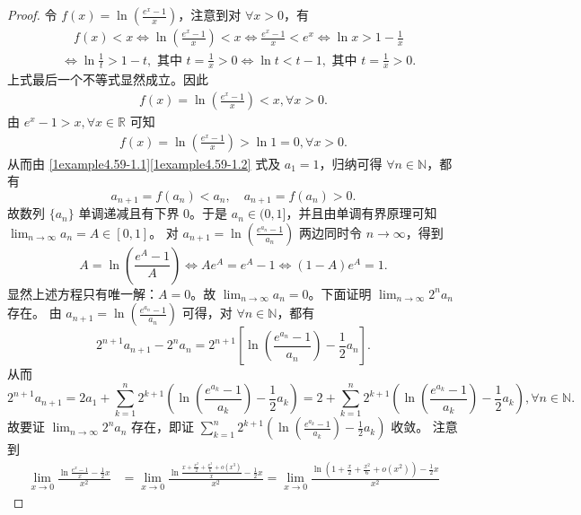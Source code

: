 \documentclass[../../main.tex]{subfiles}%
\begin{document}
\begin{proof}

令 \(f(x)=\ln\left(\frac{e^x - 1}{x}\right)\)，注意到对 \(\forall x > 0\)，有
\begin{align*}
& \quad f(x) < x \Leftrightarrow \ln\left(\frac{e^x - 1}{x}\right) < x \Leftrightarrow \frac{e^x - 1}{x} < e^x \Leftrightarrow \ln x > 1 - \frac{1}{x}\\
&\Leftrightarrow \ln\frac{1}{t} > 1 - t,\text{ 其中 }t = \frac{1}{x} > 0 \Leftrightarrow \ln t < t - 1,\text{ 其中 }t = \frac{1}{x} > 0.
\end{align*}
上式最后一个不等式显然成立。因此
\begin{align}
f(x)=\ln\left(\frac{e^x - 1}{x}\right) < x,\forall x > 0. \label{1example4.59-1.1}  
\end{align}
由 \(e^x - 1 > x,\forall x \in \mathbb{R}\) 可知
\begin{align}
f(x)=\ln\left(\frac{e^x - 1}{x}\right) > \ln 1 = 0,\forall x > 0. \label{1example4.59-1.2}
\end{align}
从而由 \eqref{1example4.59-1.1}\eqref{1example4.59-1.2} 式及 \(a_1 = 1\)，归纳可得 \(\forall n \in \mathbb{N}\)，都有
\[
a_{n + 1} = f(a_n) < a_n,\quad a_{n + 1} = f(a_n) > 0.
\]
故数列 \(\{ a_n \}\) 单调递减且有下界 \(0\)。于是 \(a_n \in (0, 1]\)，并且由单调有界原理可知 \(\lim_{n \to \infty} a_n = A \in [0, 1]\)。
对 \(a_{n + 1} = \ln\left(\frac{e^{a_n} - 1}{a_n}\right)\) 两边同时令 \(n \to \infty\)，得到
\[
A = \ln\left(\frac{e^A - 1}{A}\right) \Leftrightarrow Ae^A = e^A - 1 \Leftrightarrow (1 - A)e^A = 1.
\]
显然上述方程只有唯一解：\(A = 0\)。故 \(\lim_{n \to \infty} a_n = 0\)。下面证明 \(\lim_{n \to \infty} 2^n a_n\) 存在。
由 \(a_{n + 1} = \ln\left(\frac{e^{a_n} - 1}{a_n}\right)\) 可得，对 \(\forall n \in \mathbb{N}\)，都有
\[
2^{n + 1} a_{n + 1} - 2^n a_n = 2^{n + 1}\left[\ln\left(\frac{e^{a_n} - 1}{a_n}\right) - \frac{1}{2} a_n\right].
\]
从而
\[
2^{n + 1} a_{n + 1} = 2a_1 + \sum_{k = 1}^n 2^{k + 1}\left(\ln\left(\frac{e^{a_k} - 1}{a_k}\right) - \frac{1}{2} a_k\right) = 2 + \sum_{k = 1}^n 2^{k + 1}\left(\ln\left(\frac{e^{a_k} - 1}{a_k}\right) - \frac{1}{2} a_k\right),\forall n \in \mathbb{N}.
\]
故要证 \(\lim_{n \to \infty} 2^n a_n\) 存在，即证 \(\sum_{k = 1}^n 2^{k + 1}\left(\ln\left(\frac{e^{a_k} - 1}{a_k}\right) - \frac{1}{2} a_k\right)\) 收敛。
注意到
\begin{align*}
\lim_{x\rightarrow 0} \frac{\ln \frac{e^x-1}{x}-\frac{1}{2}x}{x^2}&=\lim_{x\rightarrow 0} \frac{\ln \frac{x+\frac{x^2}{2}+\frac{x^3}{6}+o(x^3)}{x}-\frac{1}{2}x}{x^2}=\lim_{x\rightarrow 0} \frac{\ln \left( 1+\frac{x}{2}+\frac{x^2}{6}+o(x^2) \right) -\frac{1}{2}x}{x^2}

\end{align*}
\end{proof}
\end{document}
